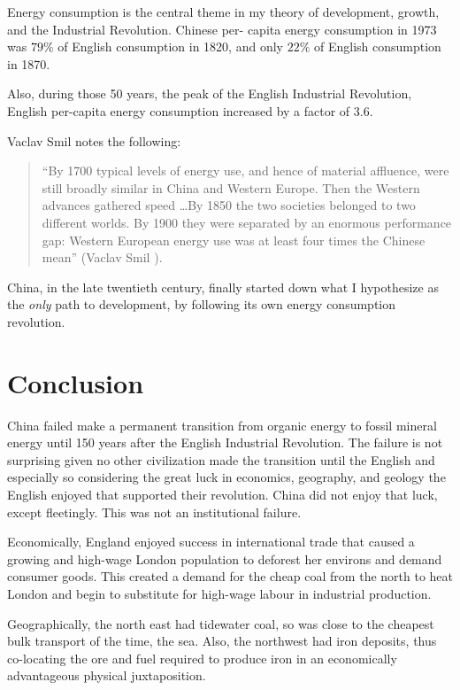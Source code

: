 \documentclass[12pt]{article}
\numberwithin{equation}{section}
\begin{document}
	
	Energy consumption is the central theme in my theory of development, growth, and the Industrial Revolution. Chinese per- capita energy consumption in 1973 was $79\%$ of English consumption in 1820, and only $22\%$ of English consumption in 1870.
	
	Also, during those 50 years, the peak of the English Industrial Revolution, English per-capita energy consumption increased by a factor of 3.6. 
	
	Vaclav Smil notes the following:
	
	\begin{quotation}
	``By 1700 typical levels of energy use, and hence of material affluence, were still broadly similar in China and Western Europe. Then the Western advances gathered speed \ldots By 1850 the two societies belonged to two different worlds. By 1900 they were separated by an enormous performance gap: Western European energy use was at least four times the Chinese mean'' (Vaclav Smil \citeyear[p.~234]{smil_energy_1994}).
	\end{quotation} 
	
	China, in the late twentieth century, finally started down what I hypothesize as the \textit{only} path to development, by following its own energy consumption revolution.
	
	\section*{Conclusion}

	China failed make a permanent transition from organic energy to fossil mineral energy until 150 years after the English Industrial Revolution. The failure is not surprising given no other civilization made the transition until the English and especially so considering the great luck in economics, geography, and geology the English enjoyed that supported their revolution. China did not enjoy that luck, except fleetingly. This was not an institutional failure.
	
	Economically, England enjoyed success in international trade that caused a growing and high-wage London population to deforest her environs and demand consumer goods. This created a demand for the cheap coal from the north to heat London and begin to substitute for high-wage labour in industrial production.
	
	Geographically, the north east had tidewater coal, so was close to the cheapest bulk transport of the time, the sea. Also, the northwest had iron deposits, thus co-locating the ore and fuel required to produce iron in an economically advantageous physical juxtaposition. 
	
\end{document}
